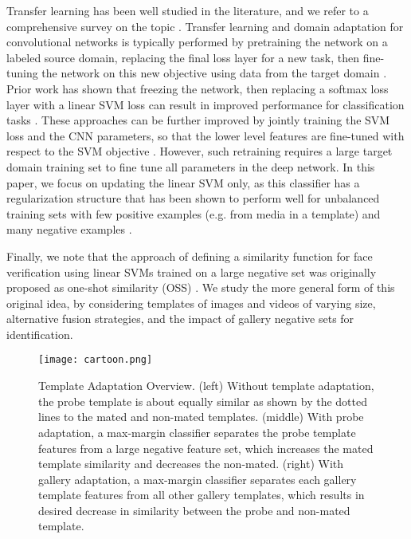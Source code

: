 \documentclass[10pt,twocolumn,letterpaper]{article}
\theoremstyle{definition}		\newtheorem{defn}[thm]{Definition}
\newcommand{\figwidth}{6.85in}
\begin{document}
Transfer learning has been well studied in the literature, and we refer to a comprehensive survey on the topic \cite{pan2010survey}.  
Transfer learning and domain adaptation for convolutional networks is typically performed by pretraining the network on a labeled source domain, replacing the final loss layer for a new task, then fine-tuning the network on this new objective using data from the target domain \cite{Razavian14}.  Prior work has shown that freezing the network, then replacing a softmax loss layer with a linear SVM loss can result in improved performance for classification tasks \cite{Tang13,Huang06}.  These approaches can be further improved by jointly training the SVM loss and the CNN parameters, so that the lower level features are fine-tuned with respect to the SVM objective \cite{Tang13}.  However, such retraining requires a large target domain training set to fine tune all parameters in the deep network.  In this paper, we focus on updating the linear SVM only, as this classifier has a regularization structure that has been shown to perform well for unbalanced training sets with few positive examples (e.g. from media in a template) and many negative examples \cite{Malisiewicz11}\cite{Kobayashi15}.  

Finally, we note that the approach of defining a similarity function for face verification using linear SVMs trained on a large negative set was originally proposed as one-shot similarity (OSS) \cite{Wolf09}\cite{Wolf11b}.  We study the more general form of this original idea, by considering templates of images and videos of varying size, alternative fusion strategies, and the impact of gallery negative sets for identification.  


\ifdefined\ECCV
\begin{figure*}[!t]
\begin{centering}
\texttt{[image: cartoon.png]} 
\caption{Template Adaptation Overview.  (left) Without template adaptation, the probe template is about equally similar as shown by the dotted lines to the mated and non-mated templates.  (middle) With probe adaptation, a max-margin classifier separates the probe template features from a large negative feature set, which increases the mated template similarity and decreases the non-mated.
 (right) With gallery adaptation, a max-margin classifier separates each gallery template features from all other gallery templates, which results in desired decrease in similarity between the probe and non-mated template.  
}
\label{f:cartoon}
\end{centering}
\end{figure*}
 \fi
\end{document}
